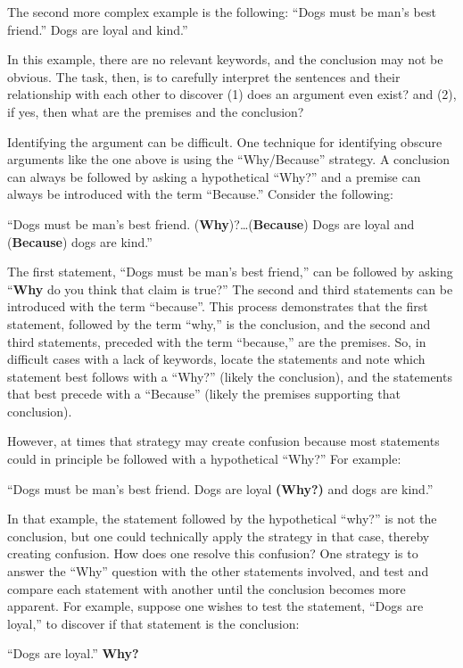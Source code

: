 \documentclass[
]{book}
\begin{document}
The second more complex example is the following:
``Dogs must be man's best friend.'' Dogs are loyal and kind.''

In this example, there are no relevant keywords, and the conclusion may not be obvious. The task, then, is to carefully interpret the sentences and their relationship with each other to discover (1) does an argument even exist? and (2), if yes, then what are the premises and the conclusion?

Identifying the argument can be difficult. One technique for identifying obscure arguments like the one above is using the ``Why/Because'' strategy. A conclusion can always be followed by asking a hypothetical ``Why?'' and a premise can always be introduced with the term ``Because.'' Consider the following:

``Dogs must be man's best friend. (\textbf{Why})?\ldots(\textbf{Because}) Dogs are loyal and (\textbf{Because}) dogs are kind.''

The first statement, ``Dogs must be man's best friend,'' can be followed by asking ``\textbf{Why} do you think that claim is true?'' The second and third statements can be introduced with the term ``because''. This process demonstrates that the first statement, followed by the term ``why,'' is the conclusion, and the second and third statements, preceded with the term ``because,'' are the premises. So, in difficult cases with a lack of keywords, locate the statements and note which statement best follows with a ``Why?'' (likely the conclusion), and the statements that best precede with a ``Because'' (likely the premises supporting that conclusion).

However, at times that strategy may create confusion because most statements could in principle be followed with a hypothetical ``Why?'' For example:

``Dogs must be man's best friend. Dogs are loyal \textbf{(Why?)} and dogs are kind.''

In that example, the statement followed by the hypothetical ``why?'' is not the conclusion, but one could technically apply the strategy in that case, thereby creating confusion. How does one resolve this confusion? One strategy is to answer the ``Why'' question with the other statements involved, and test and compare each statement with another until the conclusion becomes more apparent. For example, suppose one wishes to test the statement, ``Dogs are loyal,'' to discover if that statement is the conclusion:

``Dogs are loyal.'' \textbf{Why?}
\end{document}
